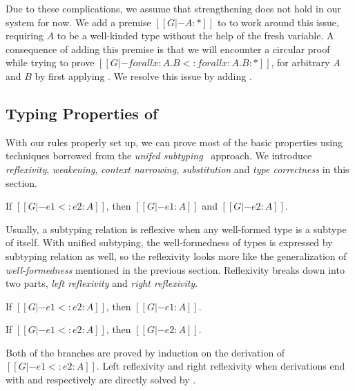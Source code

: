 Due to these complications, we assume that strengthening does not hold in our system for now.
We add a premise $[[G |- A : *]]$ to  to work around this issue,
requiring $A$ to be a well-kinded type without the help of the fresh variable.
A consequence of adding this premise is that we will encounter a circular proof
while trying to prove $[[G |- forall x : A. B <: forall x : A . B : *]]$, for
arbitrary $A$ and $B$ by first applying . We resolve this issue by
adding .

\subsection{Typing Properties of \name}
\label{sec:typing-properties}

With our rules properly set up, we can prove most of the basic properties
using techniques borrowed from the \emph{unifed subtyping}~\citep{full} approach.
We introduce \emph{reflexivity}, \emph{weakening},
\emph{context narrowing}, \emph{substitution} and \emph{type correctness}
in this section.

\begin{theorem}[Reflexivity]
   If $[[G |- e1 <: e2 : A]]$,
   then $[[G |- e1 : A]]$ and $[[G |- e2 : A]]$.
\end{theorem}

Usually, a subtyping relation is reflexive when any well-formed type is a subtype
of itself. With unified subtyping, the well-formedness of types is expressed by
subtyping relation as well, so the reflexivity looks more like the generalization
of \emph{well-formedness} mentioned in the previous section. Reflexivity
breaks down into two parts, \emph{left reflexivity} and \emph{right reflexivity}.

\begin{lemma}
   If $[[G |- e1 <: e2 : A]]$,
   then $[[G |- e1 : A]]$.
\end{lemma}

\begin{lemma}
   If $[[G |- e1 <: e2 : A]]$,
   then $[[G |- e2 : A]]$.
\end{lemma}

\noindent Both of the branches are proved by induction on the derivation of
$[[G |- e1 <: e2 : A]]$.
Left reflexivity and right reflexivity when derivations end with 
and  respectively are directly solved by .

